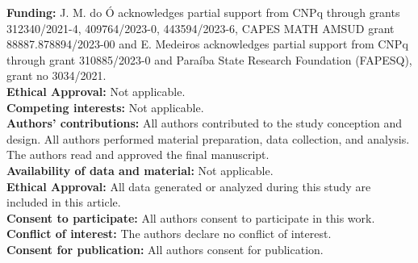 \documentclass[12pt,reqno]{amsart}
\begin{document}
\begin{flushleft}
	{\bf Funding:}  
	J. M. do \'O acknowledges partial support from CNPq through grants 312340/2021-4, 409764/2023-0, 443594/2023-6, CAPES MATH AMSUD grant 88887.878894/2023-00 and E. Medeiros acknowledges partial support from CNPq through grant 310885/2023-0
	and Para\'iba State Research Foundation (FAPESQ), grant no 3034/2021.  \\
	{\bf Ethical Approval:}  Not applicable.\\
	{\bf Competing interests:}  Not applicable. \\
	{\bf Authors' contributions:}    All authors contributed to the study conception and design. All authors performed material preparation, data collection, and analysis. The authors read and approved the final manuscript.\\
	{\bf Availability of data and material:}  Not applicable.\\
	{\bf Ethical Approval:}  All data generated or analyzed during this study are included in this article.\\
	{\bf Consent to participate:}  All authors consent to participate in this work.\\
	{\bf Conflict of interest:} The authors declare no conflict of interest. \\
	{\bf Consent for publication:}  All authors consent for publication. \\
\end{flushleft}


\bigskip
	


 
 
 
\end{document}
